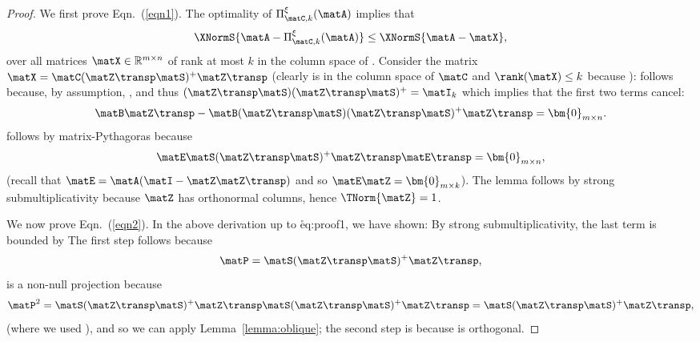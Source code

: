 \begin{proof}
We first prove Eqn.~(\ref{eqn1}).
The optimality of $\Pi^{\xi}_{\matC,k}(\matA)$ implies that
$$\XNormS{\matA - \Pi^{\xi}_{\matC,k}(\matA)}
\leq \XNormS{\matA - \matX},$$ over all matrices $\matX \in \mathbb{R}^{m \times n}$ of rank at most $k$ in the column space of \math{\matC}.
Consider the matrix $\matX = \matC(\matZ\transp \matS)^+ \matZ\transp$ (clearly \math{\matX}
is in the column space of $\matC$ and $\rank(\matX)\le k$ because
):
 follows because, by assumption, , and thus $(\matZ\transp \matS) (\matZ\transp \matS)^+=\matI_{k}$ which implies
that the first two terms cancel:
$$ \matB \matZ\transp - \matB (\matZ\transp \matS) (\matZ\transp \matS)^+ \matZ\transp = \bm{0}_{m \times n}.$$
 follows by matrix-Pythagoras because
$$\matE\matS(\matZ\transp\matS)^+\matZ\transp \matE\transp = \bm{0}_{m \times n},$$
(recall that $\matE = \matA(\matI-\matZ\matZ\transp)$ and so
$\matE\matZ = \bm{0}_{m \times k}$).
The lemma follows by strong submultiplicativity
because $\matZ$ has orthonormal columns, hence  $\TNorm{\matZ}=1$.

We now prove Eqn.~(\ref{eqn2}).
In the above derivation up to \r{eq:proof1},
we have shown:
By strong submultiplicativity, the last term is bounded by
The first step follows because
$$\matP=\matS(\matZ\transp\matS)^+\matZ\transp,$$ is a non-null
projection because
$$\matP^2=\matS(\matZ\transp\matS)^+\matZ\transp\matS(\matZ\transp\matS)^+\matZ\transp=\matS(\matZ\transp\matS)^+\matZ\transp,$$
(where we used ), and so
we can apply Lemma~\ref{lemma:oblique};
the second step is because \math{\matZ} is orthogonal.
\end{proof}


